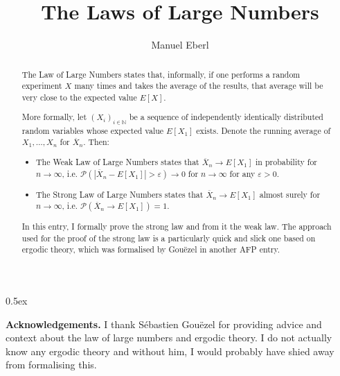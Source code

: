 \documentclass[11pt,a4paper]{article}
\begin{document}
\nocite{Simonnet1996}
\nocite{krengel}

\title{The Laws of Large Numbers}
\author{Manuel Eberl}
\date{}
\maketitle

\begin{abstract}
The Law of Large Numbers states that, informally, if one performs a random experiment $X$ many times and takes the average of the results, that average will be very close to the expected value $E[X]$.

More formally, let $(X_i)_{i\in\mathbb{N}}$ be a sequence of independently identically distributed random variables whose expected value $E[X_1]$ exists. Denote the running average of $X_1, \ldots, X_n$ for $\overline{X}_n$. Then:
\begin{itemize}
\item The Weak Law of Large Numbers states that $\overline{X}_{\!n} \longrightarrow E[X_1]$ in probability for $n\to\infty$, i.e. $\mathcal{P}(|\overline{X}_{\!n} - E[X_1]| > \varepsilon) \longrightarrow 0$ for $n\to\infty$ for any $\varepsilon > 0$.
\item The Strong Law of Large Numbers states that $\overline{X}_{\!n} \longrightarrow E[X_1]$ almost surely for $n\to\infty$, i.e. $\mathcal{P}(\overline{X}_{\!n} \longrightarrow E[X_1]) = 1$.
\end{itemize}

In this entry, I formally prove the strong law and from it the weak law. The approach used for the proof of the strong law is a particularly quick and slick one based on ergodic theory, which was formalised by Gou\"ezel in another AFP entry.
\end{abstract}

\tableofcontents

\parindent 0pt\parskip 0.5ex



\vspace{2em}
\textbf{Acknowledgements.} I thank Sébastien Gouëzel for providing advice and context about the
law of large numbers and ergodic theory. I do not actually know any ergodic theory and without him,
I would probably have shied away from formalising this.

{\raggedright


}
\end{document}
